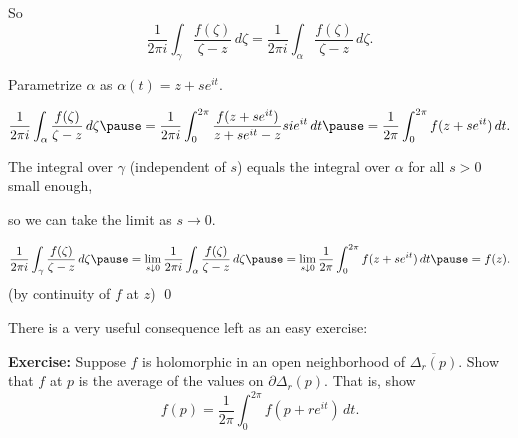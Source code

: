 \documentclass[10pt,aspectratio=169]{beamer}
\begin{document}
\begin{frame}
So
\[
\frac{1}{2\pi i}
\int_{\gamma} \frac{f(\zeta)}{\zeta-z} \, d\zeta =
\frac{1}{2\pi i}
\int_{\alpha} \frac{f(\zeta)}{\zeta-z} \, d\zeta .
\]
\pause

Parametrize $\alpha$ as $\alpha(t) = z+s e^{i t}$.

\pause

\[
\frac{1}{2\pi i}
\int_{\alpha}
\frac{f(\zeta)}{\zeta-z}
\,
d \zeta
\pause
=
\frac{1}{2\pi i}
\int_0^{2\pi} \frac{f(z+se^{it})}{z + se^{it} - z} s i e^{it} \, dt
\pause
=
\frac{1}{2\pi}
\int_0^{2\pi} f(z+se^{it}) \, dt .
\]

\pause

The integral over $\gamma$ (independent of $s$)
equals the integral over $\alpha$ for all $s > 0$ small enough,

\pause

so we can take the limit as $s \to 0$.

\pause
\medskip

\begin{equation*}
\frac{1}{2\pi i}
\int_{\gamma}
\frac{f(\zeta)}{\zeta-z}
\,
d \zeta
\pause
=
\lim_{s \downarrow 0}
\frac{1}{2\pi i}
\int_{\alpha}
\frac{f(\zeta)}{\zeta-z}
\,
d \zeta
\pause
=
\lim_{s \downarrow 0}
\frac{1}{2\pi}
\int_0^{2\pi} f(z+se^{it}) \, dt
\pause
=
f(z) .
\end{equation*}
\hspace*{3.8in}(by continuity of $f$ at $z$) \qed

\end{frame}

\begin{frame}
There is a very useful consequence left as an easy exercise:

\medskip
\pause

\textbf{Exercise:}
Suppose $f$ is holomorphic in an open neighborhood of
$\overline{\Delta_r(p)}$.
Show that $f$ at $p$ is the average of the values on $\partial \Delta_r(p)$.
That is, show
\[
f(p) = \frac{1}{2\pi} \int_0^{2\pi} f(p + r e^{it}) \, dt .
\]




\end{frame}
\end{document}
